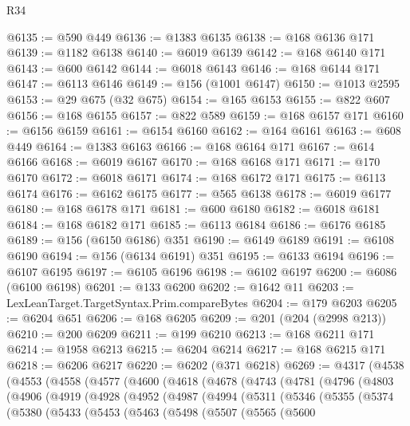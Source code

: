 \begin{lexlean}{R34}
\begin{coremodule}
@6135 := @590 @449
@6136 := @1383 @6135
@6138 := @168 @6136 @171
@6139 := @1182 @6138
@6140 := @6019 @6139
@6142 := @168 @6140 @171
@6143 := @600 @6142
@6144 := @6018 @6143
@6146 := @168 @6144 @171
@6147 := @6113 @6146
@6149 := @156 (@1001 @6147)
@6150 := @1013 @2595
@6153 := @29 @675 (@32 @675)
@6154 := @165 @6153
@6155 := @822 @607
@6156 := @168 @6155
@6157 := @822 @589
@6159 := @168 @6157 @171
@6160 := @6156 @6159
@6161 := @6154 @6160
@6162 := @164 @6161
@6163 := @608 @449
@6164 := @1383 @6163
@6166 := @168 @6164 @171
@6167 := @614 @6166
@6168 := @6019 @6167
@6170 := @168 @6168 @171
@6171 := @170 @6170
@6172 := @6018 @6171
@6174 := @168 @6172 @171
@6175 := @6113 @6174
@6176 := @6162 @6175
@6177 := @565 @6138
@6178 := @6019 @6177
@6180 := @168 @6178 @171
@6181 := @600 @6180
@6182 := @6018 @6181
@6184 := @168 @6182 @171
@6185 := @6113 @6184
@6186 := @6176 @6185
@6189 := @156 (@6150 @6186) @351
@6190 := @6149 @6189
@6191 := @6108 @6190
@6194 := @156 (@6134 @6191) @351
@6195 := @6133 @6194
@6196 := @6107 @6195
@6197 := @6105 @6196
@6198 := @6102 @6197
@6200 := @6086 (@6100 @6198)
@6201 := @133 @6200
@6202 := @1642 @11
@6203 := LexLeanTarget.TargetSyntax.Prim.compareBytes
@6204 := @179 @6203
@6205 := @6204 @651
@6206 := @168 @6205
@6209 := @201 (@204 (@2998 @213))
@6210 := @200 @6209
@6211 := @199 @6210
@6213 := @168 @6211 @171
@6214 := @1958 @6213
@6215 := @6204 @6214
@6217 := @168 @6215 @171
@6218 := @6206 @6217
@6220 := @6202 (@371 @6218)
@6269 := @4317
    (@4538
      (@4553
        (@4558
          (@4577
            (@4600
              (@4618
                (@4678
                  (@4743
                    (@4781
                      (@4796
                        (@4803
                          (@4906
                            (@4919
                              (@4928
                                (@4952
                                  (@4987
                                    (@4994
                                      (@5311
                                        (@5346
                                          (@5355
                                            (@5374
                                              (@5380
                                                (@5433
                                                  (@5453
                                                    (@5463
                                                      (@5498
                                                        (@5507
                                                          (@5565
                                                            (@5600

\end{coremodule}
\end{lexlean}
